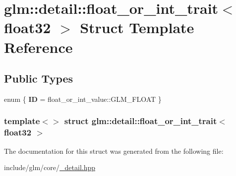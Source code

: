 \hypertarget{structglm_1_1detail_1_1float__or__int__trait_3_01float32_01_4}{\section{glm\-:\-:detail\-:\-:float\-\_\-or\-\_\-int\-\_\-trait$<$ float32 $>$ \-Struct \-Template \-Reference}
\label{structglm_1_1detail_1_1float__or__int__trait_3_01float32_01_4}
}
\subsection*{\-Public \-Types}
\begin{DoxyCompactItemize}
\item 
enum \{ {\bfseries \-I\-D} =  float\-\_\-or\-\_\-int\-\_\-value\-:\-:\-G\-L\-M\-\_\-\-F\-L\-O\-A\-T
 \}
\end{DoxyCompactItemize}
\subsubsection*{template$<$$>$ struct glm\-::detail\-::float\-\_\-or\-\_\-int\-\_\-trait$<$ float32 $>$}



\-The documentation for this struct was generated from the following file\-:\begin{DoxyCompactItemize}
\item 
include/glm/core/\hyperlink{__detail_8hpp}{\-\_\-detail.\-hpp}\end{DoxyCompactItemize}
